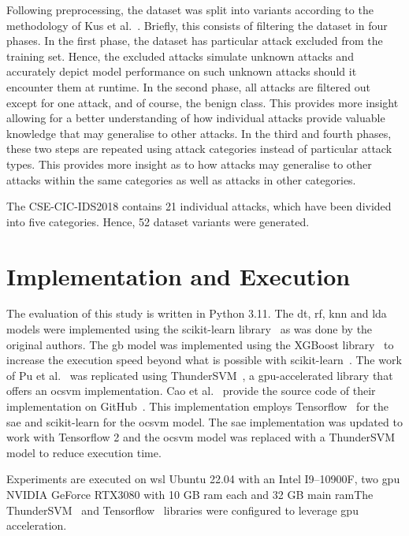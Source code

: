 Following preprocessing, the dataset was split into variants according to the
methodology of Kus et al.~\cite{Kus}. Briefly, this consists of filtering the
dataset in four phases. In the first phase, the dataset has particular attack
excluded from the training set. Hence, the excluded attacks simulate unknown
attacks and accurately depict model performance on such unknown attacks should
it encounter them at runtime. In the second phase, all attacks are filtered out
except for one attack, and of course, the benign class. This provides more
insight allowing for a better understanding of how individual attacks provide
valuable knowledge that may generalise to other attacks. In the third and
fourth phases, these two steps are repeated using attack categories instead of
particular attack types. This provides more insight as to how attacks may
generalise to other attacks within the same categories as well as attacks in
other categories.

The CSE-CIC-IDS2018 contains 21 individual attacks, which have been divided
into five categories. Hence, 52 dataset variants were generated.

\section{Implementation and Execution}%
\label{sec:implementation}

The evaluation of this study is written in Python 3.11. The \gls{dt}, \gls{rf},
\gls{knn} and \gls{lda} models were implemented using the scikit-learn
library~\cite{scikit-learn} as was done by the original authors. The \gls{gb}
model was implemented using the XGBoost library~\cite{xgboost} to increase the
execution speed beyond what is possible with scikit-learn~\cite{scikit-learn}.
The work of Pu et al.~\cite{Pu} was replicated using
ThunderSVM~\cite{ThunderSVM}, a \gls{gpu}-accelerated library that offers an
\gls{ocsvm} implementation. Cao et al.~\cite{Cao} provide the source code of
their implementation on GitHub~\cite{cao_git}. This implementation employs
Tensorflow~\cite{tensorflow} for the \gls{sae} and scikit-learn for the
\gls{ocsvm} model. The \gls{sae} implementation was updated to work with
Tensorflow 2 and the \gls{ocsvm} model was replaced with a
ThunderSVM~\cite{ThunderSVM} model to reduce execution time.

Experiments are executed on \gls{wsl} Ubuntu 22.04 with an Intel I9--10900F,
two \gls{gpu} NVIDIA GeForce RTX3080 with 10 GB \gls{ram} each and 32 GB main
\gls{ram}\@ The ThunderSVM~\cite{ThunderSVM} and Tensorflow~\cite{tensorflow}
libraries were configured to leverage \gls{gpu} acceleration.

